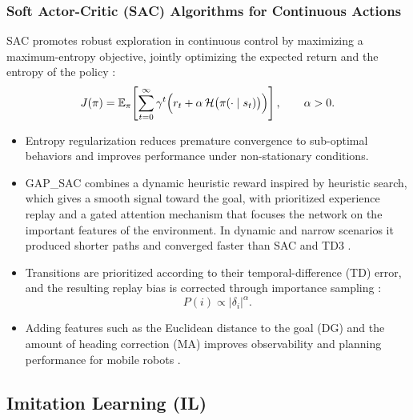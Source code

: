 \subsubsection{Soft Actor-Critic (SAC) Algorithms for Continuous Actions}

SAC promotes robust exploration in continuous control by maximizing a
maximum-entropy objective, jointly optimizing the expected return and the entropy
of the policy \cite{haarnoja2018soft,zhang2025deep}:
\begin{equation}
  J(\pi) = \mathbb{E}_{\pi}\!\left[\sum_{t=0}^{\infty} \gamma^{t}
           \Bigl(r_t + \alpha\, \mathcal{H}\bigl(\pi(\cdot \mid s_t)\bigr)\Bigr)\right],
  \qquad \alpha > 0.
  \label{eq:sac}
\end{equation}
\begin{itemize}
  \item {} Entropy regularization reduces
        premature convergence to sub-optimal behaviors and improves performance
        under non-stationary conditions.
  \item {} GAP\_SAC combines a dynamic
        heuristic reward inspired by heuristic search, which gives a smooth
        signal toward the goal, with prioritized experience replay and a gated
        attention mechanism that focuses the network on the important features
        of the environment. In dynamic and narrow scenarios it produced shorter
        paths and converged faster than SAC and TD3 \cite{zhang2025deep}.
  \item {} Transitions are prioritized according to their
        temporal-difference (TD) error, and the resulting replay bias is
        corrected through importance sampling \cite{schaul2016prioritized}:
        \begin{equation}
          P(i) \propto \left|\delta_i\right|^{\alpha}.
          \label{eq:per}
        \end{equation}
  \item {} Adding features such as the Euclidean distance
        to the goal (DG) and the amount of heading correction (MA) improves
        observability and planning performance for mobile robots \cite{zhang2025deep}.
\end{itemize}

\subsection{Imitation Learning (IL)}

